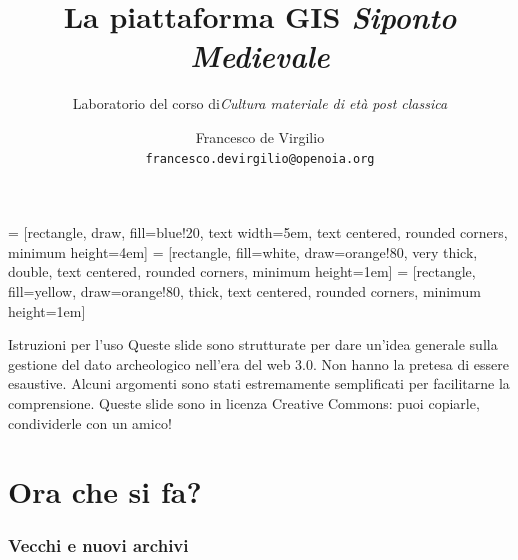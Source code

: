 \documentclass{beamer}
\title[La piattaforma GIS \emph{Siponto Medievale}]{La piattaforma GIS \emph{Siponto Medievale}}
\subtitle{Laboratorio del corso di\linebreak\emph{Cultura materiale di età post classica}}
\author[Francesco de Virgilio]{Francesco de Virgilio \\ \texttt{\tiny francesco.devirgilio@openoia.org}}
\institute[O.I.A.~Open Idea for Archaeology]{
	OIA --- Open Idea for Archaeology%
	}
\begin{document}
 = [rectangle, draw, fill=blue!20, text width=5em, text centered, rounded corners, minimum height=4em]
 = [rectangle, fill=white, draw=orange!80, very thick, double, text centered, rounded corners, minimum height=1em]
 = [rectangle, fill=yellow, draw=orange!80, thick, text centered, rounded corners, minimum height=1em]


\begin{frame}
	\titlepage
\end{frame}



	
\begin{frame}{Istruzioni per l'uso}
    Queste slide sono strutturate per dare un'idea generale sulla gestione del dato archeologico nell'era del web 3.0. Non hanno la pretesa di essere esaustive. Alcuni argomenti sono stati estremamente semplificati per facilitarne la comprensione.\vfill
    Queste slide sono in licenza Creative Commons: puoi copiarle, condividerle con un amico!
    \begin{center}
        \Large{\ccbyncsa}
    \end{center}
\end{frame}

\part{Ora che si fa?}
	\frame{\partpage}

    \section{Vecchi e nuovi archivi}
\end{document}
